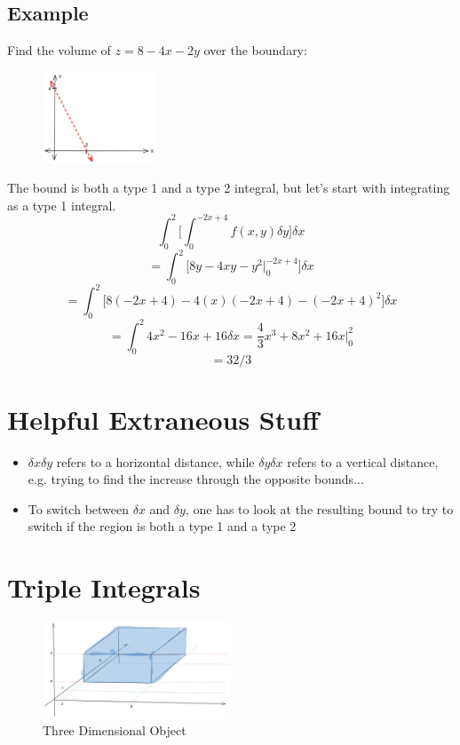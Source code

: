 \documentclass{article}
\begin{document}
\subsection{Example}
Find the volume of $z = 8 - 4x - 2y$ over the boundary:
\begin{figure}[H]
    \centering
    \includegraphics[width=0.3\textwidth]{figures/BoundedExample.png}
\end{figure}
The bound is both a type 1 and a type 2 integral, but let's start with integrating as a type 1 integral.
$$\int_{0}^{2} \big[\int_{0}^{-2x+4} f(x, y) \delta y\big] \delta x$$
$$= \int_{0}^{2} \big[8y - 4xy - y^2\big|_0^{-2x+4}\big] \delta x$$
$$= \int_{0}^{2} \big[8(-2x+4) - 4(x)(-2x+4) - (-2x+4)^2\big] \delta x$$
$$= \int_{0}^{2} 4x^2 - 16 x + 16 \delta x = \frac{4}{3} x^3 + 8x^2 + 16x \big|_0^2$$
$$ = \boxed{32/3}$$


\section{Helpful Extraneous Stuff}
\begin{itemize}
    \item $\delta x \delta y$ refers to a horizontal distance, while $\delta y \delta x$ refers to a vertical distance, e.g. trying to find the increase through the opposite bounds...
    \item To switch between $\delta x$ and $\delta y$, one has to look at the resulting bound to try to switch if the region is both a type 1 and a type 2
\end{itemize}

\section{Triple Integrals}

\begin{figure}[H]
    \centering
    \includegraphics[width=0.5\textwidth]{figures/Rectangle.png}
    \caption{Three Dimensional Object}
\end{figure}
\end{document}
